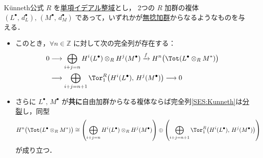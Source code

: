 \documentclass[algtopo_main]{subfiles}
\begin{document}
\begin{mycol}[label=col:Kunneth]{K\"unneth公式}
    $R$ を\hyperref[def:PID]{単項イデアル整域}とし，
    2つの $R$ 加群の複体 $(L^\bullet,\, d_L^\bullet),\, (M^\bullet,\, d_M^\bullet)$ であって，いずれかが\hyperref[def:torsion-free-mod]{無捻加群}からなるようなものを与える．
    \begin{itemize}
        \item このとき，$\forall n \in \mathbb{Z}$ に対して次の完全列が存在する：
        \begin{align}
            0 &\lto \bigoplus_{i+j=n} H^i(L^\bullet) \otimes_R H^j(M^\bullet) \xrightarrow{f} H^n \bigl( \Tot (L^\bullet \otimes_R M^*) \bigr) \\
            &\lto \bigoplus_{i+j=n+1} \Tor_1^R \bigl(H^i(L^\bullet),\, H^j(M^\bullet) \bigr) \lto 0 \label{SES:Kunneth}
        \end{align}
        \item さらに $L^\bullet,\, M^\bullet$ が\textbf{共に}自由加群からなる複体ならば完全列\eqref{SES:Kunneth}は\hyperref[def:split]{分裂}し，同型
        \begin{align}
            \label{isom:Kunneth}
            H^n \bigl( \Tot (L^\bullet \otimes_R M^*) \bigr) \cong \left( \bigoplus_{i+j=n} H^i(L^\bullet) \otimes_R H^j(M^\bullet)  \right) \oplus \left( \bigoplus_{i+j=n+1} \Tor_1^R \bigl(H^i(L^\bullet),\, H^j(M^\bullet) \bigr) \right) 
        \end{align}
        が成り立つ．
    \end{itemize}
\end{mycol}
\end{document}
